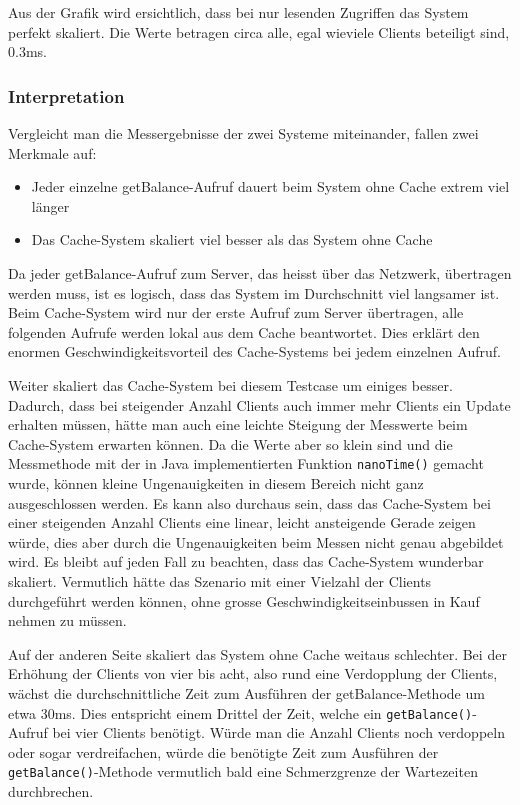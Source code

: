 Aus der Grafik wird ersichtlich, dass bei nur lesenden Zu\-griffen das System perfekt skaliert. Die Werte betragen circa alle, egal wieviele Clients beteiligt sind, 0.3ms. 


\subsubsection{Interpretation}

Vergleicht man die Messergebnisse der zwei Systeme miteinander, fallen zwei Merkmale auf:
\begin{itemize}
\item Jeder einzelne getBalance-Aufruf dauert beim System ohne Cache extrem viel länger
\item Das Cache-System skaliert viel besser als das System ohne Cache
\end{itemize}

Da jeder getBalance-Aufruf zum Server, das heisst über das Netzwerk,
übertragen werden muss, ist es logisch, dass das System im
Durchschnitt viel langsamer ist. Beim Cache-System wird nur der erste
Aufruf zum Server übertragen, alle folgenden Aufrufe werden lokal aus
dem Cache beantwortet. Dies erklärt den enormen
Geschwindigkeitsvorteil des Cache-Systems bei jedem einzelnen Aufruf.

Weiter skaliert das Cache-System bei diesem Testcase um einiges besser. Dadurch, dass bei steigender Anzahl Clients auch immer mehr Clients ein Update erhalten müssen, hätte man auch eine leichte Steigung der Messwerte beim Cache-System erwarten können. Da die Werte aber so klein sind und die Messmethode mit der in Java implementierten Funktion \texttt{nanoTime()} gemacht wurde, können kleine Ungenauigkeiten in diesem Bereich nicht ganz ausgeschlossen werden. Es kann also durchaus sein, dass das Cache-System bei einer steigenden Anzahl Clients eine linear, leicht ansteigende Gerade zeigen würde, dies aber durch die Ungenauigkeiten beim Messen nicht genau abgebildet wird. Es bleibt auf jeden Fall zu beachten, dass das Cache-System wunderbar skaliert. Vermutlich hätte das Szenario mit einer Vielzahl der Clients durchgeführt werden können, ohne grosse Geschwindigkeitseinbussen in Kauf nehmen zu müssen.

Auf der anderen Seite skaliert das System ohne Cache weitaus schlechter. Bei der Erhöhung der Clients von vier bis acht, also rund eine Verdopplung der Clients, wächst die durchschnittliche Zeit zum Ausführen der getBalance-Methode um etwa 30ms. Dies entspricht einem Drittel der Zeit, welche ein \texttt{getBalance()}-Aufruf bei vier Clients benötigt. Würde man die An\-zahl Cli\-ents noch verdoppeln oder sogar verdreifachen, würde die benötigte Zeit zum Ausführen der \texttt{getBalance()}-Methode vermutlich bald eine Schmerzgrenze der Wartezeiten durchbrechen.

